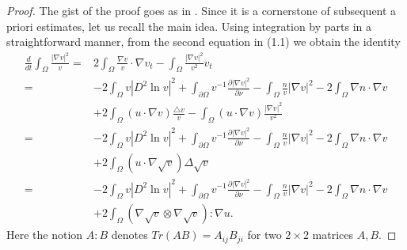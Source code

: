 \documentclass[12pt]{article}
\theoremstyle{plain}
\theoremstyle{definition}
\numberwithin{equation}{section}
\begin{document}
\begin{proof}[Proof] The gist of the proof goes as in \cite[Lemmas 3.2--3.4]{WinklerCPDE}. Since it is a cornerstone of subsequent a priori estimates,
let us recall the main idea. Using integration by parts in a straightforward manner, from the second equation in (1.1)
we obtain the identity
	\begin{equation}\label{3.4}
\begin{split}
\frac d{dt}\int_\Omega  \frac{|\nabla v|^2}v
=&2 \int_\Omega \frac{\nabla v}v\cdot \nabla v_{t}-\int_\Omega\frac{|\nabla v|^2}{v^2}v_{t}\\
=&-2 \int_\Omega v|D^2\ln v|^2
+\int_{\partial\Omega}v^{-1}\frac {\partial |\nabla v|^2}{\partial \nu}
-
\int_\Omega \frac nv |\nabla v|^2- 2\int_\Omega \nabla n\cdot\nabla v
\\
&+2\int_\Omega (u\cdot \nabla v)\frac {\triangle v}v- \int_\Omega  (u\cdot \nabla v)
\frac {|\nabla v|^2}{v^2}
\\
=& -2 \int_\Omega v|D^2\ln v|^2
+\int_{\partial\Omega}v^{-1}\frac {\partial |\nabla v|^2}{\partial \nu}
-
\int_\Omega \frac nv |\nabla v|^2
- 2\int_\Omega \nabla n\cdot\nabla v\\
&+
 2\int_\Omega (u\cdot\nabla\sqrt{v}) \Delta \sqrt{v}\\
 =& -2 \int_\Omega v|D^2\ln v|^2
+\int_{\partial\Omega}v^{-1}\frac {\partial |\nabla v|^2}{\partial \nu}
-
\int_\Omega \frac nv |\nabla v|^2
- 2\int_\Omega \nabla n\cdot\nabla v\\
&+
 2
\int_\Omega (\nabla\sqrt{v}\otimes\nabla \sqrt{v}):\nabla u.
\end{split}
\end{equation}
 Here the notion $A : B$ denotes $Tr(AB) = A_{ij}B_{ji}$ for two $2\times2$ matrices $A, B$.


\end{proof}
\end{document}
